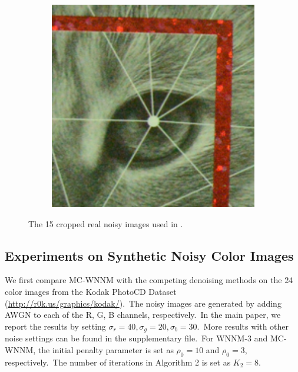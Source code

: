 \begin{figure}
\begin{subfigure}[t]{0.19\textwidth}
    \end{subfigure}
    \hfill
    \begin{subfigure}[t]{0.19\textwidth}
        \centering
        \includegraphics[width=1\textwidth]{images/mcwnnm/resize_d800_iso6400_3_real.png}
    \end{subfigure}
\hfill
    \caption{The 15 cropped real noisy images used in \cite{crosschannel2016}.}
    \label{fig2}
\end{figure}


\subsection{Experiments on Synthetic Noisy Color Images}

We first compare MC-WNNM with the competing denoising methods \cite{cbm3d,mlp,chen2015learning,dncnn,noiseclinic,neatimage} on the 24 color images from the Kodak PhotoCD Dataset (\url{http://r0k.us/graphics/kodak/}).\ The noisy images are generated by adding AWGN to each of the R, G, B channels, respectively.\ In the main paper, we report the results by setting $\sigma_{r}=40, \sigma_{g}=20, \sigma_{b}=30$.\ More results with other noise settings can be found in the supplementary file.\ For WNNM-3 and MC-WNNM, the initial penalty parameter is set as $\rho_{0}=10$ and $\rho_{0}=3$, respectively.\ The number of iterations in Algorithm 2 is set as $K_{2}=8$. 

